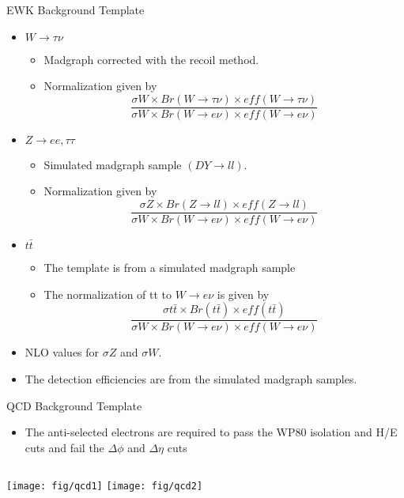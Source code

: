 \documentclass[t, 8pt]{beamer}
\begin{document}
\begin{frame}{EWK Background Template}
  \begin{itemize}
    \item $W \to \tau \nu$
    \begin{itemize}
      \item Madgraph corrected with the recoil method. 
      \item Normalization given by 
      \begin{equation}
      \frac { \sigma W \times Br(W\to\tau\nu) \times eff(W\to\tau\nu)}
      { \sigma W \times Br(W\to e \nu) \times eff(W\to e\nu)}
      \end{equation}
    \end{itemize}
    \item $Z \to ee, \tau \tau$
    \begin{itemize}
      \item Simulated madgraph sample $(DY \to ll)$.
      \item Normalization given by %
      \begin{equation}
      \frac { \sigma Z \times Br(Z\to ll) \times eff(Z\to ll)}
      { \sigma W \times Br(W\to e \nu) \times eff(W\to e\nu)}
      \end{equation}
    \end{itemize}
    \item $t\bar t$
    \begin{itemize}
      \item The template is from a simulated madgraph sample
      \item The normalization of tt to $W\to e \nu$ is given by %
      \begin{equation}
      \frac { \sigma t\bar t \times Br(t\bar t) \times eff(t\bar t)}
      { \sigma W \times Br(W\to e \nu) \times eff(W\to e\nu)}
      \end{equation}
    \end{itemize}
    \item NLO values for $\sigma Z$ and $\sigma W$. 
    \item The detection efficiencies are from the simulated madgraph samples.
  \end{itemize}
\end{frame}


\begin{frame}{QCD Background Template}
  \begin{itemize}
    \item The anti-selected electrons are required to pass the WP80 isolation
    and H/E cuts and fail the $\Delta \phi$ and $\Delta \eta$ cuts
  \end{itemize}
  \begin{columns}[c]
    \texttt{[image: fig/qcd1]}
    \texttt{[image: fig/qcd2]}
  \end{columns}
\end{frame}
\end{document}
